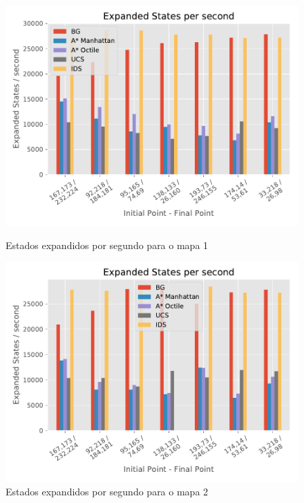 \begin{figure}[!htbp]
\begin{minipage}{0.5\linewidth}
\centering
\includegraphics[width=\textwidth]{Images/Expanded_States_sec_map1.pdf}
\caption{Estados expandidos por segundo para o mapa 1}
\label{fig:expanded-sec1}
\end{minipage}%
\begin{minipage}{0.5\linewidth}
\centering
\includegraphics[width=\textwidth]{Images/Expanded_States_sec_map2.pdf}
\caption{Estados expandidos por segundo para o mapa 2}
\label{fig:expanded-sec2}
\end{minipage}
\begin{minipage}{0.5\linewidth}
\centering

\end{minipage}
\end{figure}
